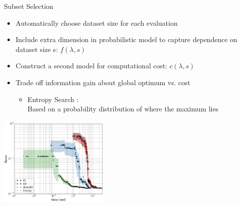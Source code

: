 \begin{frame}[c,fragile]{Subset Selection }

\begin{itemize}
  \item Automatically choose dataset size for each evaluation
  \item Include extra dimension in probabilistic model to capture dependence on dataset size s: $f(\lambda,s)$
  \item Construct a second model for computational cost: $c(\lambda,s)$
  \item Trade off information gain about global optimum vs. cost
  \begin{itemize}
   \item Entropy Search :\\ Based on a probability distribution of where the maximum lies
  \end{itemize} 
\end{itemize}

\centering
\includegraphics[width=0.4\textwidth]{images/subset_results}

\end{frame}

